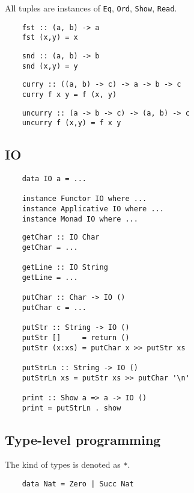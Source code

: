 \begin{multicols}{2}
	All tuples are instances of \texttt{Eq}, \texttt{Ord}, \texttt{Show}, \texttt{Read}.
	
	\begin{verbatim}
	fst :: (a, b) -> a
	fst (x,y) = x
	\end{verbatim}
	
	\begin{verbatim}
	snd :: (a, b) -> b
	snd (x,y) = y
	\end{verbatim}
	
	\begin{verbatim}
	curry :: ((a, b) -> c) -> a -> b -> c 
	curry f x y = f (x, y)
	\end{verbatim}
	
	\begin{verbatim}
	uncurry :: (a -> b -> c) -> (a, b) -> c
	uncurry f (x,y) = f x y
	\end{verbatim}
	
	\subsection*{IO}
	
	\begin{verbatim}
	data IO a = ...
	
	instance Functor IO where ...
	instance Applicative IO where ...
	instance Monad IO where ...
	\end{verbatim}
	
	\begin{verbatim}
	getChar :: IO Char
	getChar = ...
	
	getLine :: IO String
	getLine = ...
	
	putChar :: Char -> IO ()
	putChar c = ...
	
	putStr :: String -> IO ()
	putStr []     = return ()
	putStr (x:xs) = putChar x >> putStr xs
	
	putStrLn :: String -> IO ()
	putStrLn xs = putStr xs >> putChar '\n'
	
	print :: Show a => a -> IO ()
	print = putStrLn . show
	\end{verbatim}
	
	\subsection*{Type-level programming}
	
	The kind of types is denoted as \texttt{*}. 
	
	\begin{verbatim}
	data Nat = Zero | Succ Nat
	\end{verbatim}
\end{multicols}
